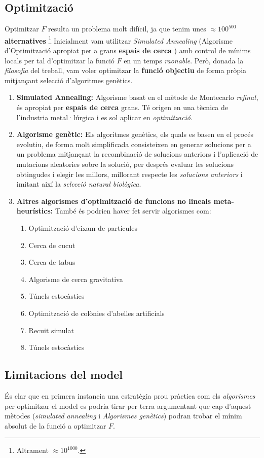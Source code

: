 \documentclass[10pt,twocolumn]{article}
\begin{document}
\subsection{Optimització}
Optimitzar $F$ resulta un problema molt difícil, ja que tenim unes $\approx 100^{500}$ \textbf{alternatives} \footnote{Altrament $ \approx 10^{1000}$.} Inicialment vam utilitzar \textit{Simulated Annealing} (Algorisme d'Optimització apropiat per a grans \textbf{espais de cerca} ) amb control de mínims locals per tal d'optimitzar  la funció $F$ en un temps \textit{raonable}. Però, donada la \textit{filosofia} del treball, vam voler  optimitzar la \textbf{funció objectiu} de forma pròpia mitjançant selecció d'algoritmes genètics.   
\begin{enumerate}
	\item \textbf{Simulated Annealing:} Algorisme  basat en el mètode de Montecarlo \textit{refinat}, és apropiat per \textbf{espais de cerca} grans. Té origen en una tècnica de l'industria metal·lúrgica i es sol aplicar en \textit{optimització}.
	\item \textbf{Algorisme genètic:} Els algoritmes genètics, els quals es basen en el procés evolutiu, de forma molt simplificada consisteixen en generar solucions per a un problema mitjançant la recombinació de solucions anteriors i l'aplicació de mutacions aleatories sobre la solució, per després evaluar les solucions obtingudes i elegir les millors, millorant respecte les \textit{solucions anteriors} i imitant així la \textit{selecció natural biològica}.
	\item \textbf{Altres algorismes d'optimització de funcions no lineals meta-heurístics:} També és podrien haver fet servir algorismes com:  
	\begin{enumerate}
		\item Optimització d'eixam de partícules
		\item Cerca de cucut
		\item Cerca de tabus
		\item Algorisme de cerca gravitativa
		\item Túnels estocàstics
		\item Optimització de colònies d’abelles artificials
		\item Recuit simulat
		\item Túnels estocàstics
	\end{enumerate}
\end{enumerate}
\subsection{Limitacions del model}
És clar que en primera instancia una estratègia prou pràctica com els \textit{algorismes} per optimitzar el model es podria tirar per terra argumentant que cap d'aquest mètodes (\textit{simulated annealing} i \textit{Algorismes genètics}) podran trobar el mínim absolut de la funció a optimitzar $F$. 
\end{document}

